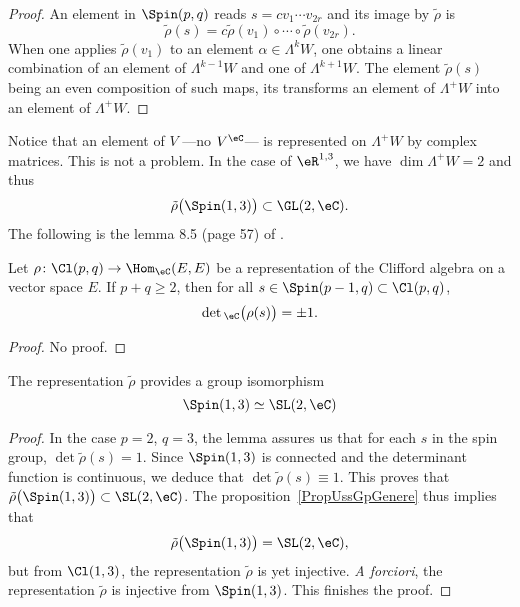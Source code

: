 \begin{proof}
An element in $\Spin(p,q)$ reads $s=cv_1\cdots v_{2r}$ and its image by $\tilde\rho$ is
\[
  \tilde\rho(s)=c\tilde\rho(v_1)\circ \cdots \circ\tilde\rho(v_{2r}).
\]
When one applies $\tilde\rho(v_1)$ to an element $\alpha\in\Lambda^kW$, one obtains a linear combination of an element of $\Lambda^{k-1}W$ and one of $\Lambda^{k+1}W$. The element $\tilde\rho(s)$ being an even composition of such maps, its transforms an element of $\Lambda^+W$ into an element of $\Lambda^+W$.
\end{proof}

Notice that an element of $V$ ---no $V^{\eC}$--- is represented on $\Lambda^+W$ by complex matrices. This is not a problem. In the case of $\eR^{1,3}$, we have $\dim\Lambda^+W=2$ and thus
\[
  \tilde\rho\big( \Spin(1,3) \big)\subset \GL(2,\eC).
\]
The following is the lemma 8.5 (page 57) of \cite{Michelson}.

\begin{lemma}
Let $\rho\colon \Cl(p,q)\to \Hom_{\eC}(E,E)$ be a representation of the Clifford algebra on a vector space $E$. If $p+q\geq 2$, then for all $s\in\Spin(p-1,q)\subset \Cl(p,q) $,
\[
  \det{}_{\eC}\big( \rho(s) \big)=\pm 1.
\]

\end{lemma}
\begin{proof}
No proof.
\end{proof}

\begin{theorem}
The representation $\tilde\rho$ provides a group isomorphism
\[
  \Spin(1,3)\simeq \SL(2,\eC)
\]

\end{theorem}

\begin{proof}
In the case $p=2$, $q=3$, the lemma assures us that for each $s$ in the spin group, $\det\tilde\rho(s)=1$. Since $\Spin(1,3)$ is connected and the determinant function is continuous, we deduce that $\det\tilde\rho(s)\equiv 1$. This proves that $\tilde\rho\big( \Spin(1,3) \big)\subset \SL(2,\eC)$. The proposition~\ref{PropUssGpGenere} thus implies that
\[
  \tilde\rho\big( \Spin(1,3) \big)=\SL(2,\eC),
\]
 but from $\Cl(1,3)$, the representation $\tilde\rho$ is yet injective. \emph{A forciori}, the representation $\tilde\rho$ is injective from $\Spin(1,3)$. This finishes the proof.
\end{proof}
